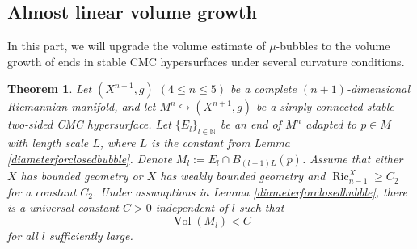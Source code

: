 \documentclass[11pt,letterpaper]{amsart}
\DeclareMathOperator{\Vol}{Vol}
\DeclareMathOperator{\Ric}{Ric}
\newcommand{\bN}{\mathbb{N}}
\newtheorem{theorem}{Theorem}[section]
\theoremstyle{definition}
\theoremstyle{remark}
\numberwithin{equation}{section}
\begin{document}
\subsection{Almost linear volume growth} 
In this part, we will upgrade the volume estimate of $\mu$-bubbles to the volume growth of ends in stable CMC hypersurfaces under several curvature conditions.


\begin{theorem}\label{volumeforslice}
    Let $(X^{n+1},g)$ $(4\leq n\leq 5)$ be a complete $(n+1)$-dimensional Riemannian manifold, and let $M^n\hookrightarrow (X^{n+1},g)$ be a simply-connected stable two-sided CMC hypersurface. Let $\{E_l\}_{l\in\bN}$ be an end of $M^n$ adapted to $p\in M$ with length scale $L$, where $L$ is the constant from Lemma \ref{diameterforclosedbubble}. Denote $M_l:=E_l\cap B_{(l+1)L}(p)$. Assume that either $X$ has bounded geometry or $X$ has weakly bounded geometry and $\Ric^X_{n-1}\geq C_2$ for a constant $C_2$. Under assumptions in Lemma \ref{diameterforclosedbubble}, there is a universal constant $C>0$ independent of $l$ such that
    \begin{equation*}
        \Vol(M_l)<C
    \end{equation*}
    for all $l$ sufficiently large.
\end{theorem}

 
\end{document}
